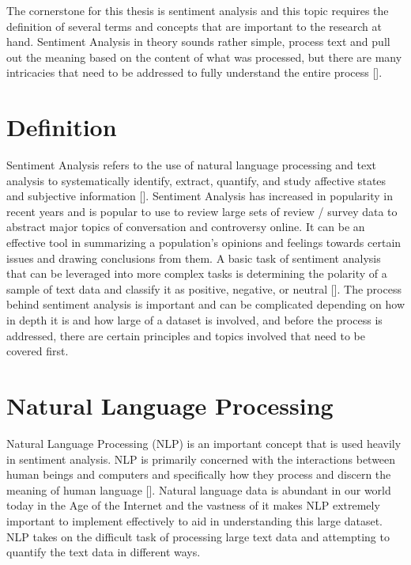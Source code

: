 The cornerstone for this thesis is sentiment analysis and this topic requires the definition of several terms and concepts that are important to the research at hand.
Sentiment Analysis in theory sounds rather simple, process text and pull out the meaning based on the content of what was processed, but there are many intricacies that need to be addressed to fully understand the entire process [\cite{liu2012sentiment}].

\section{Definition}
Sentiment Analysis refers to the use of natural language processing and text analysis to systematically identify, extract, quantify, and study affective states and subjective information [\cite{liu2012sentiment}].
Sentiment Analysis has increased in popularity in recent years and is popular to use to review large sets of review / survey data to abstract major topics of conversation and controversy online.
It can be an effective tool in summarizing a population's opinions and feelings towards certain issues and drawing conclusions from them.
A basic task of sentiment analysis that can be leveraged into more complex tasks is determining the polarity of a sample of text data and classify it as positive, negative, or neutral [\cite{wilson2005recognizing}].
The process behind sentiment analysis is important and can be complicated depending on how in depth it is and how large of a dataset is involved, and before the process is addressed, there are certain principles and topics involved that need to be covered first.

\section{Natural Language Processing}
Natural Language Processing (NLP) is an important concept that is used heavily in sentiment analysis.
NLP is primarily concerned with the interactions between human beings and computers and specifically how they process and discern the meaning of human language [\cite{liddy2001natural}].
Natural language data is abundant in our world today in the Age of the Internet and the vastness of it makes NLP extremely important to implement effectively to aid in understanding this large dataset.
NLP takes on the difficult task of processing large text data and attempting to quantify the text data in different ways.

